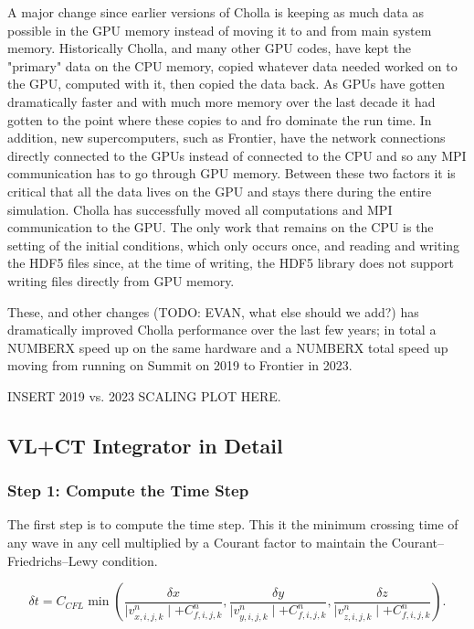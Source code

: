 A major change since earlier versions of Cholla is keeping as much data as possible in the GPU memory instead of moving it to and from main system memory. Historically Cholla, and many other GPU codes, have kept the "primary" data on the CPU memory, copied whatever data needed worked on to the GPU, computed with it, then copied the data back. As GPUs have gotten dramatically faster and with much more memory over the last decade it had gotten to the point where these copies to and fro dominate the run time. In addition, new supercomputers, such as Frontier, have the network connections directly connected to the GPUs instead of connected to the CPU and so any MPI communication has to go through GPU memory. Between these two factors it is critical that all the data lives on the GPU and stays there during the entire simulation. Cholla has successfully moved all computations and MPI communication to the GPU. The only work that remains on the CPU is the setting of the initial conditions, which only occurs once, and reading and writing the HDF5 files since, at the time of writing, the HDF5 library does not support writing files directly from GPU memory.

These, and other changes (TODO: EVAN, what else should we add?) has dramatically improved Cholla performance over the last few years; in total a NUMBERX speed up on the same hardware and a NUMBERX total speed up moving from running on Summit on 2019 to Frontier in 2023.

INSERT 2019 vs. 2023 SCALING PLOT HERE.

\subsection{VL+CT Integrator in Detail}
\label{vlct:header}

\subsubsection{Step 1: Compute the Time Step}
\label{vlct:dt}

The first step is to compute the time step. This it the minimum crossing time of any wave in any cell multiplied by a Courant factor to maintain the Courant–Friedrichs–Lewy condition.

\begin{equation}
    \label{eqn:dt}
    \delta t = C_{CFL} \min \left(
        \frac{\delta x}{\mid v^n_{x,i,j,k} \mid + C^n_{f,i,j,k}},
        \frac{\delta y}{\mid v^n_{y,i,j,k} \mid + C^n_{f,i,j,k}},
        \frac{\delta z}{\mid v^n_{z,i,j,k} \mid + C^n_{f,i,j,k}}
    \right).
\end{equation}

